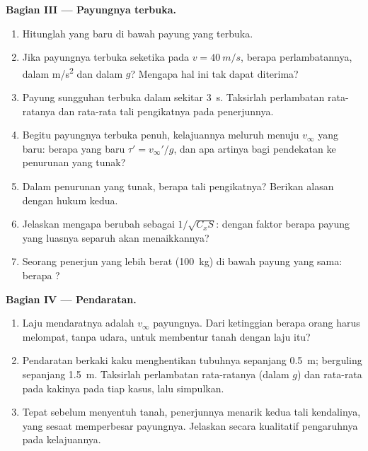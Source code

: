 \begin{problem}
\medskip
\noindent\textbf{Bagian III --- Payungnya terbuka.}
\begin{enumerate}[resume]
  \item Hitunglah  yang baru di bawah payung yang terbuka.
  \item Jika payungnya terbuka seketika pada $v = \qty{40}{m/s}$, berapa
        perlambatannya, dalam \unit{m/s^2} dan dalam $g$? Mengapa hal
        ini tak dapat diterima?
  \item Payung sungguhan terbuka dalam sekitar \qty{3}{s}. Taksirlah
        perlambatan rata-ratanya dan  rata-rata tali pengikatnya
        pada penerjunnya.
  \item Begitu payungnya terbuka penuh, kelajuannya meluruh menuju
        $v_\infty$ yang baru: berapa  yang baru
        $\tau' = v_\infty'/g$, dan apa artinya bagi pendekatan ke
        penurunan yang tunak?
  \item Dalam penurunan yang tunak, berapa  tali pengikatnya?
        Berikan alasan dengan hukum kedua.
  \item Jelaskan mengapa  berubah sebagai
        $1/\sqrt{C_xS}$: dengan faktor berapa payung yang luasnya
        separuh akan menaikkannya?
  \item Seorang penerjun yang lebih berat (\qty{100}{kg}) di bawah
        payung yang sama: berapa ?
\end{enumerate}

\medskip
\noindent\textbf{Bagian IV --- Pendaratan.}
\begin{enumerate}[resume]
  \item Laju mendaratnya adalah $v_\infty$ payungnya. Dari ketinggian
        berapa orang harus melompat, tanpa udara, untuk membentur tanah
        dengan laju itu?
  \item Pendaratan berkaki kaku menghentikan tubuhnya sepanjang
        \qty{0.5}{m}; berguling sepanjang \qty{1.5}{m}. Taksirlah
        perlambatan rata-ratanya (dalam $g$) dan  rata-rata pada
        kakinya pada tiap kasus, lalu simpulkan.
  \item Tepat sebelum menyentuh tanah, penerjunnya menarik kedua tali
        kendalinya, yang sesaat memperbesar  payungnya.
        Jelaskan secara kualitatif pengaruhnya pada kelajuannya.
\end{enumerate}


\end{problem}
